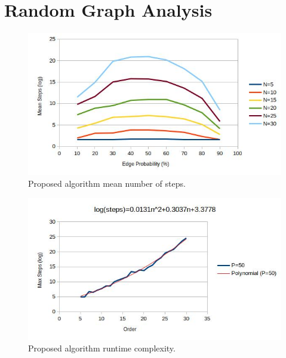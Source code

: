 \section{Random Graph Analysis}\label{sec:random}

\begin{figure}[H]
  \centering
  \includegraphics[width=5in]{qz_steps}
  \caption{Proposed algorithm mean number of steps.}
  \label{fig:qzsteps}
\end{figure}

\begin{figure}[H]
  \centering
  \includegraphics[width=5in]{qz_runtime}
  \caption{Proposed algorithm runtime complexity.}
  \label{fig:qzruntime}
\end{figure}
